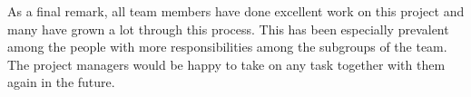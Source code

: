 \documentclass[a4paper]{article}
\begin{document}
As a final remark, all team members have done excellent work on this project and many have grown a lot through this process. This has been especially prevalent among the people with more responsibilities among the subgroups of the team. The project managers would be happy to take on any task together with them again in the future. 





%
%
%
%
%
%
%
%
%
%
\end{document}
